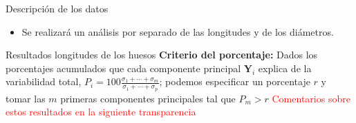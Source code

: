 \documentclass{beamer}
\begin{document}
\begin{frame}{Descripción de los datos}
\begin{itemize}
\begin{columns}
\begin{column}{0.4\textwidth}
    \end{column}
    \end{columns}
    \vskip 0.5cm
    \item Se realizará un análisis por separado de las longitudes y de los diámetros.
\end{itemize}
\end{frame}


\begin{frame}{Resultados longitudes de los huesos}
\textbf{Criterio del porcentaje:} Dados los porcentajes acumulados que cada componente principal $\mathbf{Y}_i$ explica de la variabilidad total, $P_i =  100 \frac{\sigma_1 + \cdots + \sigma_m}{\sigma_1 + \cdots + \sigma_p}$; podemos especificar un porcentaje $r$ y tomar las $m$ primeras componentes principales tal que $P_m > r$
\vskip 0.4cm
\vskip 0.2cm
\textcolor{red}{Comentarios sobre estos resultados en la siguiente transparencia}
\end{frame}
\end{document}
